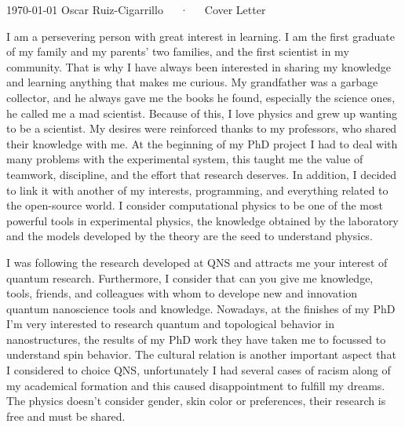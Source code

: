 \documentclass[11pt, a4paper]{awesome-cv}
\begin{document}
\makecvheader[R]

\makecvfooter
  {\today}
  {Oscar Ruiz-Cigarrillo~~~·~~~Cover Letter}
  {}

\makelettertitle

\begin{cvletter}

I am a persevering person with great interest in learning. I am the first graduate of my family and my parents' two families, and the first scientist in my community. That is why I have always been interested in sharing my knowledge and learning anything that makes me curious. My grandfather was a garbage collector, and he always gave me the books he found, especially the science ones, he called me a mad scientist. Because of this, I love physics and grew up wanting to be a scientist. My desires were reinforced thanks to my professors, who shared their knowledge with me. At the beginning of my PhD project I had to deal with many problems with the experimental system, this taught me the value of teamwork, discipline, and the effort that research deserves. In addition, I decided to link it with another of my interests, programming, and everything related to the open-source world. I consider computational physics to be one of the most powerful tools in experimental physics, the knowledge obtained by the laboratory and the models developed by the theory are the seed to understand physics.

I was following the research developed at QNS and attracts me your interest of quantum research. Furthermore, I consider that can you give me knowledge, tools, friends, and colleagues with whom to develope new and innovation quantum nanoscience tools and knowledge. 
Nowadays, at the finishes of my PhD I'm very interested to research quantum and topological behavior in nanostructures, the results of my PhD work they have taken me to focussed to understand spin behavior. 
The cultural relation is another important aspect that I considered to choice QNS, unfortunately I had several cases of racism along of my academical formation and this  caused disappointment to fulfill my dreams.  The physics doesn't consider gender, skin color or preferences, their research is free and must be shared. 


\end{cvletter}


\makeletterclosing
\end{document}
